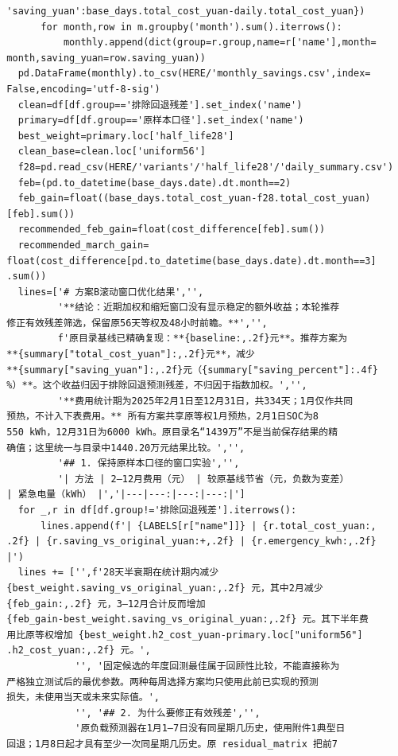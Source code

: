 \begin{verbatim}
  'saving_yuan':base_days.total_cost_yuan-daily.total_cost_yuan})
        for month,row in m.groupby('month').sum().iterrows():
            monthly.append(dict(group=r.group,name=r['name'],month=
  month,saving_yuan=row.saving_yuan))
    pd.DataFrame(monthly).to_csv(HERE/'monthly_savings.csv',index=
  False,encoding='utf-8-sig')
    clean=df[df.group=='排除回退残差'].set_index('name')
    primary=df[df.group=='原样本口径'].set_index('name')
    best_weight=primary.loc['half_life28']
    clean_base=clean.loc['uniform56']
    f28=pd.read_csv(HERE/'variants'/'half_life28'/'daily_summary.csv')
    feb=(pd.to_datetime(base_days.date).dt.month==2)
    feb_gain=float((base_days.total_cost_yuan-f28.total_cost_yuan)
  [feb].sum())
    recommended_feb_gain=float(cost_difference[feb].sum())
    recommended_march_gain=
  float(cost_difference[pd.to_datetime(base_days.date).dt.month==3]
  .sum())
    lines=['# 方案B滚动窗口优化结果','',
           '**结论：近期加权和缩短窗口没有显示稳定的额外收益；本轮推荐
  修正有效残差筛选，保留原56天等权及48小时前瞻。**','',
           f'原目录基线已精确复现：**{baseline:,.2f}元**。推荐方案为
  **{summary["total_cost_yuan"]:,.2f}元**，减少
  **{summary["saving_yuan"]:,.2f}元（{summary["saving_percent"]:.4f}
  %）**。这个收益归因于排除回退预测残差，不归因于指数加权。','',
           '**费用统计期为2025年2月1日至12月31日，共334天；1月仅作共同
  预热，不计入下表费用。** 所有方案共享原等权1月预热，2月1日SOC为8
  550 kWh，12月31日为6000 kWh。原目录名“1439万”不是当前保存结果的精
  确值；这里统一与目录中1440.20万元结果比较。','',
           '## 1. 保持原样本口径的窗口实验','',
           '| 方法 | 2—12月费用（元） | 较原基线节省（元，负数为变差）
  | 紧急电量（kWh） |','|---|---:|---:|---:|']
    for _,r in df[df.group!='排除回退残差'].iterrows():
        lines.append(f'| {LABELS[r["name"]]} | {r.total_cost_yuan:,
  .2f} | {r.saving_vs_original_yuan:+,.2f} | {r.emergency_kwh:,.2f}
  |')
    lines += ['',f'28天半衰期在统计期内减少
  {best_weight.saving_vs_original_yuan:,.2f} 元，其中2月减少
  {feb_gain:,.2f} 元，3—12月合计反而增加
  {feb_gain-best_weight.saving_vs_original_yuan:,.2f} 元。其下半年费
  用比原等权增加 {best_weight.h2_cost_yuan-primary.loc["uniform56"]
  .h2_cost_yuan:,.2f} 元。',
              '', '固定候选的年度回测最佳属于回顾性比较，不能直接称为
  严格独立测试后的最优参数。两种每周选择方案均只使用此前已实现的预测
  损失，未使用当天或未来实际值。',
              '', '## 2. 为什么要修正有效残差','',
              '原负载预测器在1月1—7日没有同星期几历史，使用附件1典型日
  回退；1月8日起才具有至少一次同星期几历史。原 residual_matrix 把前7

\end{verbatim}
